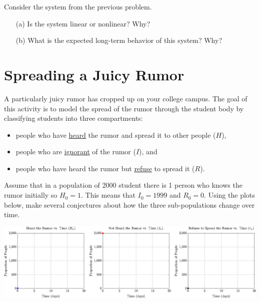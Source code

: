 

\begin{problem}
    Consider the system from the previous problem.
    \begin{enumerate}
        \item[(a)] Is the system linear or nonlinear?  Why?
        \item[(b)] What is the expected long-term behavior of this system?  Why?
    \end{enumerate}
\end{problem}


\newpage\section{Spreading a Juicy Rumor}
A particularly juicy rumor has cropped up on your college campus.  The goal of this
activity is to model the spread of the rumor through the student body by classifying
students into three compartments: 
\begin{itemize}
    \item people who have \underline{heard} the rumor and spread it to other people ($H$),
    \item people who are \underline{ignorant} of the rumor ($I$), and
    \item people who have heard the rumor but \underline{refuse} to spread it ($R$).
\end{itemize}


\begin{problem}
    Assume that in a population of 2000 student there is 1 person who knows the
    rumor initially so $H_0 = 1$.  This
    means that $I_0 = 1999$ and $R_0=0$.  Using the plots below, make several conjectures
    about how the three sub-populations change over time.
    \begin{center}
        \includegraphics[width=1.0\columnwidth]{BlankAxes.eps}
    \end{center}
\end{problem}


